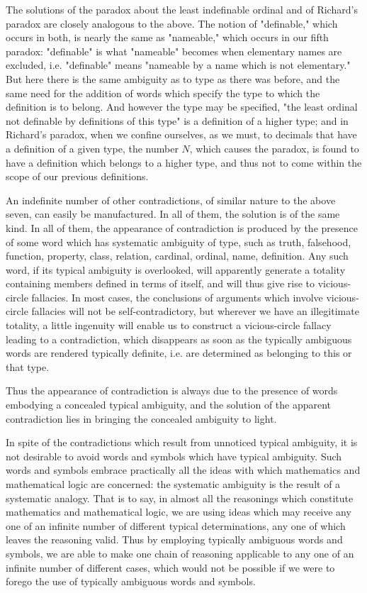 \documentclass[10pt]{article}
\begin{document}
The solutions of the paradox about the least indefinable ordinal and of Richard's paradox are closely analogous to the above. The notion of "definable," which occurs in both, is nearly the same as "nameable," which occurs in our fifth paradox: "definable" is what "nameable" becomes when elementary names are excluded, i.e. "definable" means "nameable by a name which is not elementary." But here there is the same ambiguity as to type as there was before, and the same need for the addition of words which specify the type to which the definition is to belong. And however the type may be specified, "the least ordinal not definable by definitions of this type" is a definition of a higher type; and in Richard's paradox, when we confine ourselves, as we must, to decimals that have a definition of a given type, the number $N$, which causes the paradox, is found to have a definition which belongs to a higher type, and thus not to come within the scope of our previous definitions.

An indefinite number of other contradictions, of similar nature to the above seven, can easily be manufactured. In all of them, the solution is of the same kind. In all of them, the appearance of contradiction is produced by the presence of some word which has systematic ambiguity of type, such as truth, falsehood, function, property, class, relation, cardinal, ordinal, name, definition. Any such word, if its typical ambiguity is overlooked, will apparently generate a totality containing members defined in terms of itself, and will thus give rise to vicious-circle fallacies. In most cases, the conclusions of arguments which involve vicious-circle fallacies will not be self-contradictory, but wherever we have an illegitimate totality, a little ingenuity will enable us to construct a vicious-circle fallacy leading to a contradiction, which disappears as soon as the typically ambiguous words are rendered typically definite, i.e. are determined as belonging to this or that type.

Thus the appearance of contradiction is always due to the presence of words embodying a concealed typical ambiguity, and the solution of the apparent contradiction lies in bringing the concealed ambiguity to light.

In spite of the contradictions which result from unnoticed typical ambiguity, it is not desirable to avoid words and symbols which have typical ambiguity. Such words and symbols embrace practically all the ideas with which mathematics and mathematical logic are concerned: the systematic ambiguity is the result of a systematic analogy. That is to say, in almost all the reasonings which constitute mathematics and mathematical logic, we are using ideas which may receive any one of an infinite number of different typical determinations, any one of which leaves the reasoning valid. Thus by employing typically ambiguous words and symbols, we are able to make one chain of reasoning applicable to any one of an infinite number of different cases, which would not be possible if we were to forego the use of typically ambiguous words and symbols.
\end{document}
